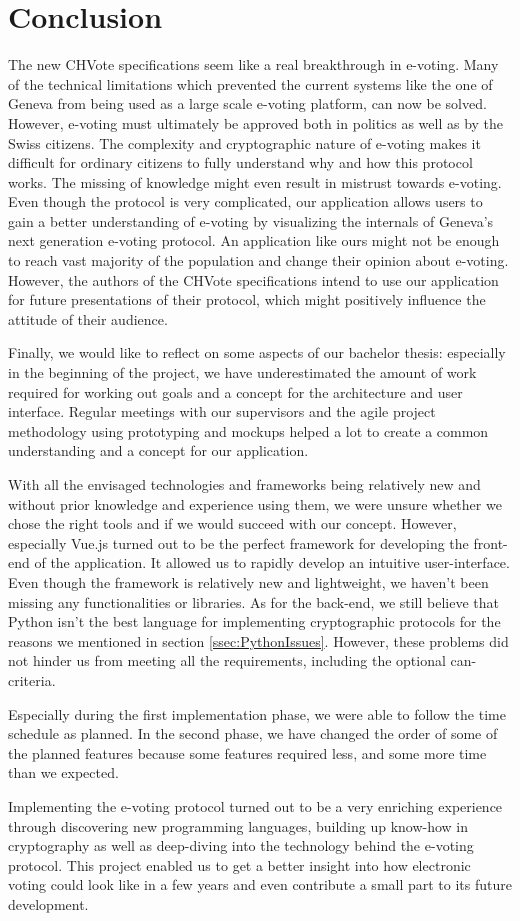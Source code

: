 \chapter{Conclusion}
The new CHVote specifications seem like a real breakthrough in e-voting. Many of the technical limitations which prevented the current systems like the one of Geneva from being used as a large scale e-voting platform, can now be solved. However, e-voting must ultimately be approved both in politics as well as by the Swiss citizens. The complexity and cryptographic nature of e-voting makes it difficult for ordinary citizens to fully understand why and how this protocol works. The missing of knowledge might even result in mistrust towards e-voting. Even though the protocol is very complicated, our application allows users to gain a better understanding of e-voting by visualizing the internals of Geneva's next generation e-voting protocol. An application like ours might not be enough to reach vast majority of the population and change their opinion about e-voting. However, the authors of the CHVote specifications intend to use our application for future presentations of their protocol, which might positively influence the attitude of their audience. 

Finally, we would like to reflect on some aspects of our bachelor thesis: especially in the beginning of the project, we have underestimated the amount of work required for working out goals and a concept for the architecture and user interface. Regular meetings with our supervisors and the agile project methodology using prototyping and mockups helped a lot to create a common understanding and a concept for our application.

With all the envisaged technologies and frameworks being relatively new and without prior knowledge and experience using them, we were unsure whether we chose the right tools and if we would succeed with our concept. However, especially Vue.js turned out to be the perfect framework for developing the front-end of the application. It allowed us to rapidly develop an intuitive user-interface. Even though the framework is relatively new and lightweight, we haven't been missing any functionalities or libraries. As for the back-end, we still believe that Python isn't the best language for implementing cryptographic protocols for the reasons we mentioned in section \ref{ssec:PythonIssues}. However, these problems did not hinder us from meeting all the requirements, including the optional can-criteria. 

Especially during the first implementation phase, we were able to follow the time schedule as planned. In the second phase, we have changed the order of some of the planned features because some features required less, and some more time than we expected.

Implementing the e-voting protocol turned out to be a very enriching experience through discovering new programming languages, building up know-how in cryptography as well as deep-diving into the technology behind the e-voting protocol. This project enabled us to get a better insight into how electronic voting could look like in a few years and even contribute a small part to its future development.